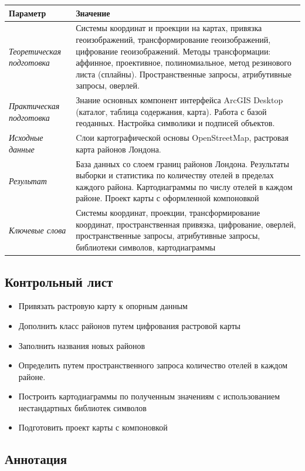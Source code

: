 \documentclass[12pt,]{book}
\providecommand{\tightlist}{%
  \setlength{\itemsep}{0pt}\setlength{\parskip}{0pt}}
\begin{document}
\begin{longtable}[]{@{}ll@{}}
\toprule
Параметр & Значение\tabularnewline
\midrule
\endhead
\emph{Теоретическая подготовка} & Системы координат и проекции на картах, привязка геоизображений, трансформирование геоизображений, цифрование геоизображений. Методы трансформации: аффинное, проективное, полиномиальное, метод резинового листа (сплайны). Пространственные запросы, атрибутивные запросы, оверлей.\tabularnewline
\emph{Практическая подготовка} & Знание основных компонент интерфейса ArcGIS Desktop (каталог, таблица содержания, карта). Работа с базой геоданных. Настройка символики и подписей объектов.\tabularnewline
\emph{Исходные данные} & Cлои картографической основы OpenStreetMap, растровая карта районов Лондона.\tabularnewline
\emph{Результат} & База данных со слоем границ районов Лондона. Результаты выборки и статистика по количеству отелей в пределах каждого района. Картодиаграммы по числу отелей в каждом районе. Проект карты с оформленной компоновкой\tabularnewline
\emph{Ключевые слова} & Системы координат, проекции, трансформирование координат, пространственная привязка, цифрование, оверлей, пространственные запросы, атрибутивные запросы, библиотеки символов, картодиаграммы\tabularnewline
\bottomrule
\end{longtable}

\hypertarget{map-ref-economic-control}{%
\subsection{Контрольный лист}\label{map-ref-economic-control}}

\begin{itemize}
\tightlist
\item
  Привязать растровую карту к опорным данным
\item
  Дополнить класс районов путем цифрования растровой карты
\item
  Заполнить названия новых районов
\item
  Определить путем пространственного запроса количество отелей в каждом районе.
\item
  Построить картодиаграммы по полученным значениям с использованием нестандартных библиотек символов
\item
  Подготовить проект карты с компоновкой
\end{itemize}

\hypertarget{map-ref-economic-annotation}{%
\subsection{Аннотация}\label{map-ref-economic-annotation}}
\end{document}
